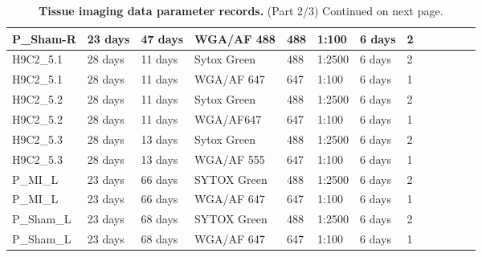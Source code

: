 \begin{table}[H]
\begin{tabular}{|>{\small}l||>{\tiny}l|>{\tiny}l|>{\tiny}l|>{\tiny}l|>{\tiny}l|>{\tiny}l|>{\tiny}l|>{\tiny}l|>{\tiny}l|>{\tiny}l|>{\tiny}l|>{\tiny}l|}
        P\_Sham-R &  23 days & 47 days & WGA/AF 488 & 488 & 1:100 & 6 days & 2   \\ \hline
        H9C2\_5.1 &  28 days & 11 days & Sytox Green & 488 & 1:2500 & 6 days & 2  \\ \hline
        H9C2\_5.1 &  28 days & 11 days & WGA/AF 647 & 647 & 1:100 & 6 days & 1   \\ \hline
        H9C2\_5.2 &  28 days & 11 days & Sytox Green & 488 & 1:2500 & 6 days & 2   \\ \hline
        H9C2\_5.2 &  28 days & 11 days & WGA/AF647 & 647 & 1:100 & 6 days & 1   \\ \hline
        H9C2\_5.3 &  28 days & 13 days & Sytox Green & 488 & 1:2500 & 6 days & 2   \\ \hline
        H9C2\_5.3 &  28 days & 13 days & WGA/AF 555 & 647 & 1:100 & 6 days & 1   \\ \hline
        P\_MI\_L &  23 days & 66 days & SYTOX Green & 488 & 1:2500 & 6 days & 2 \\ \hline
        P\_MI\_L &  23 days & 66 days & WGA/AF 647 & 647 & 1:100 & 6 days & 1  \\ \hline
        P\_Sham\_L & 23 days & 68 days & SYTOX Green & 488 & 1:2500 & 6 days & 2 \\ \hline
        P\_Sham\_L & 23 days & 68 days & WGA/AF 647 & 647 & 1:100 & 6 days & 1  \\ \hline
       
    \end{tabular}
\medskip
\caption{\textbf{Tissue imaging data parameter records.} (Part 2/3) Continued on next page.}    
\end{table}





